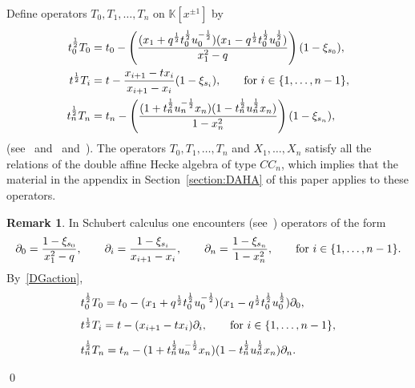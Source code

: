 \documentclass[11pt]{article}
\theoremstyle{plain}
\theoremstyle{definition}
\newtheorem{remark}[thm]{Remark}
\theoremstyle{remark}
\numberwithin{equation}{section}
\def\KK{\mathbb{K}}
\newcounter{r}
\newcounter{s}
\begin{document}
Define operators $T_0, T_1, \ldots, T_n$ on $\KK[x^{\pm1}]$ by
\begin{align}
t_0^{\frac12}T_0 &= t_0  - \left( \frac{(x_1+q^{\frac12}t^{\frac12}_0 u^{-\frac12}_0)
(x_1-q^{\frac12}t^{\frac12}_0u^{\frac12}_0)}
{x_1^2-q}\right) (1-\xi_{s_0}),
\nonumber \\
t^{\frac12}T_i &= t - \frac{x_{i+1}-tx_i}{x_{i+1}-x_i} (1-\xi_{s_i}),
\qquad\hbox{for $i\in \{1, \ldots, n-1\}$},
\label{DGaction}
\\
t_n^{\frac12}T_n &= t_n  - \left( \frac{(1+t^{\frac12}_n u^{-\frac12}_n x_n)
(1- t^{\frac12}_n u^{\frac12}_n x_n)}
{1-x_n^2}\right) (1-\xi_{s_n}),
\nonumber
\end{align}
(see~\cite[\S3]{Nou95} and~\cite[(13)]{Sah99} and~\cite[(73)]{CGdGW16}).
The operators $T_0, T_1, \ldots, T_n$ and $X_1, \ldots, X_n$ satisfy all the relations of the
double affine Hecke algebra of type $CC_n$, which implies that the material in the appendix in Section~\ref{section:DAHA} of this paper applies to these operators.

\begin{remark}
In Schubert calculus one encounters (see~\cite[\S4]{FL06}) operators  of the form
\begin{equation}
\partial_0 = \frac{1-\xi_{s_0}}{x_1^2-q}, \qquad
\partial_i = \frac{1-\xi_{s_i}}{x_{i+1}-x_i}, \qquad
\partial_n = \frac{1-\xi_{s_n}}{1-x_n^2},
\qquad\hbox{for $i\in \{1, \ldots, n-1\}$.}
\label{ddivopdefn}
\end{equation}
By~\eqref{DGaction}, 
$$
\begin{array}{l}
t_0^{\frac12}T_0 = t_0 - (x_1+q^{\frac12}t_0^{\frac12}u_0^{-\frac12})(x_1-q^{\frac12}t_0^{\frac12}u_0^{\frac12})\partial_0, \\[7pt]
t^{\frac12}T_i = t - (x_{i+1}-tx_i)\partial_i, \qquad \hbox{for $i\in \{1, \ldots, n-1\}$,} \\[7pt]
t_n^{\frac12}T_n = t_n - (1+t_n^{\frac12}u_n^{-\frac12}x_n)(1-t_n^{\frac12}u_n^{\frac12}x_n)\partial_n. 
\end{array}
$$

\qed
\end{remark}
\end{document}
